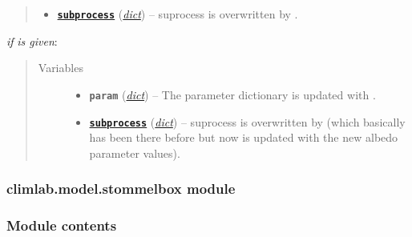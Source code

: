 \documentclass[letterpaper,10pt,english]{sphinxmanual}
\begin{document}
\begin{fulllineitems}
\begin{quote}
\begin{description}
\begin{itemize}
\item {} 
\href{http://docs.python.org/2.7/library/subprocess.html\#module-subprocess}{\textbf{\texttt{subprocess}}} (\href{http://docs.python.org/2.7/library/stdtypes.html\#dict}{\emph{dict}}) -- suprocess  is overwritten by
{\hyperref[api/climlab.surface:climlab.surface.albedo.P2Albedo]{\emph{}}}.

\end{itemize}

\end{description}\end{quote}

\emph{if}  \emph{is given}:
\begin{quote}\begin{description}
\item[{Variables}] \leavevmode\begin{itemize}
\item {} 
\textbf{\texttt{param}} (\href{http://docs.python.org/2.7/library/stdtypes.html\#dict}{\emph{dict}}) -- The parameter dictionary is updated with
.

\item {} 
\href{http://docs.python.org/2.7/library/subprocess.html\#module-subprocess}{\textbf{\texttt{subprocess}}} (\href{http://docs.python.org/2.7/library/stdtypes.html\#dict}{\emph{dict}}) -- suprocess  is overwritten by
{\hyperref[api/climlab.surface:climlab.surface.albedo.StepFunctionAlbedo]{\emph{}}} 
(which basically has been there before but now is 
updated with the new albedo parameter values).

\end{itemize}

\end{description}\end{quote}

\end{fulllineitems}



\subsubsection{climlab.model.stommelbox module}
\label{api/climlab.model:climlab-model-stommelbox-module}

\subsubsection{Module contents}
\label{api/climlab.model:module-climlab.model}\label{api/climlab.model:module-contents}
\end{document}
